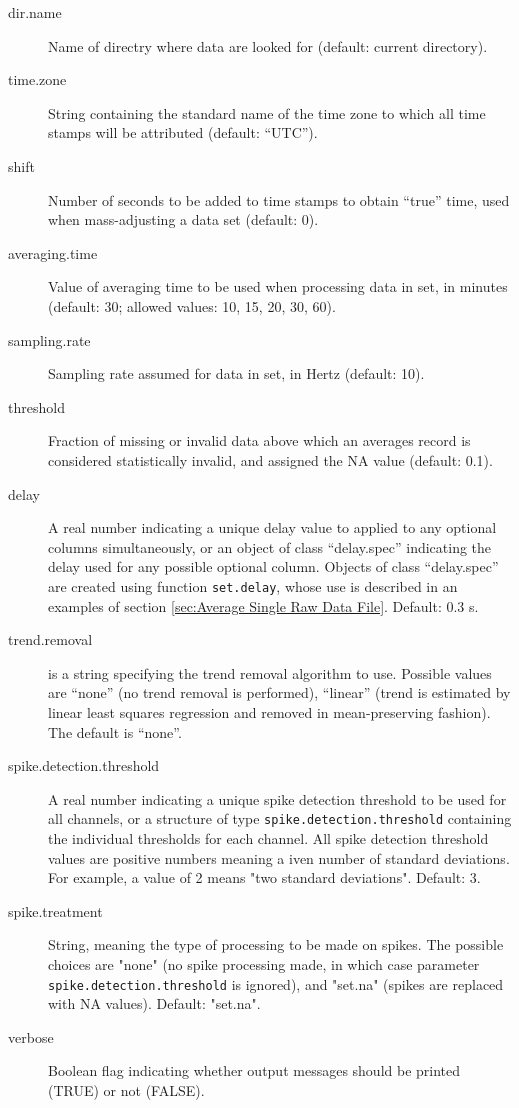 \documentclass[a4paper,10pt]{book}
\begin{document}
\begin{description}
 \item[dir.name] Name of directry where data are looked for (default: current directory).
 \item[time.zone] String containing the standard name of the time zone to which all time stamps will be attributed (default: ``UTC''). 
 \item[shift] Number of seconds to be added to time stamps to obtain ``true'' time, used when mass-adjusting a data set (default: 0).
 \item[averaging.time] Value of averaging time to be used when processing data in set, in minutes (default: 30; allowed values: 10, 15, 20, 30, 60).
 \item[sampling.rate] Sampling rate assumed for data in set, in Hertz (default: 10).
 \item[threshold] Fraction of missing or invalid data above which an averages record is considered statistically invalid, and assigned the NA value (default: 0.1).
 \item[delay] A real number indicating a unique delay value to applied to any optional columns simultaneously, or an object of class ``delay.spec'' indicating the delay used for any possible optional column. Objects of class ``delay.spec'' are created using function \verb|set.delay|, whose use is described in an examples of section \ref{sec:Average Single Raw Data File}. Default: 0.3 s.
 \item[trend.removal] is a string specifying the trend removal algorithm to use. Possible values are ``none'' (no trend removal is performed), ``linear'' (trend is estimated by linear least squares regression and removed in mean-preserving fashion). The default is ``none''.
 \item[spike.detection.threshold] A real number indicating a unique spike detection threshold to be used for all channels, or a structure of type \verb|spike.detection.threshold| containing the individual thresholds for each channel. All spike detection threshold values are positive numbers meaning a iven number of standard deviations. For example, a value of 2 means "two standard deviations". Default: 3.
 \item[spike.treatment] String, meaning the type of processing to be made on spikes. The possible choices are "none" (no spike processing made, in which case parameter \verb|spike.detection.threshold| is ignored), and "set.na" (spikes are replaced with NA values). Default: "set.na".
 \item[verbose] Boolean flag indicating whether output messages should be printed (TRUE) or not (FALSE).
\end{description}
\end{document}
